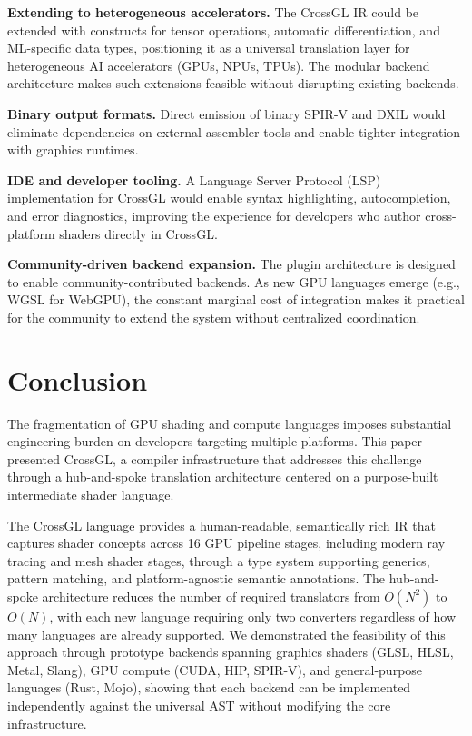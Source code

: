 \documentclass{svproc}
\begin{document}
\textbf{Extending to heterogeneous accelerators.} The CrossGL IR could be extended with constructs for tensor operations, automatic differentiation, and ML-specific data types, positioning it as a universal translation layer for heterogeneous AI accelerators (GPUs, NPUs, TPUs). The modular backend architecture makes such extensions feasible without disrupting existing backends.

\textbf{Binary output formats.} Direct emission of binary SPIR-V and DXIL would eliminate dependencies on external assembler tools and enable tighter integration with graphics runtimes.

\textbf{IDE and developer tooling.} A Language Server Protocol (LSP) implementation for CrossGL would enable syntax highlighting, autocompletion, and error diagnostics, improving the experience for developers who author cross-platform shaders directly in CrossGL.

\textbf{Community-driven backend expansion.} The plugin architecture is designed to enable community-contributed backends. As new GPU languages emerge (e.g., WGSL for WebGPU), the constant marginal cost of integration makes it practical for the community to extend the system without centralized coordination.

\section{Conclusion}

The fragmentation of GPU shading and compute languages imposes substantial engineering burden on developers targeting multiple platforms. This paper presented CrossGL, a compiler infrastructure that addresses this challenge through a hub-and-spoke translation architecture centered on a purpose-built intermediate shader language.

The CrossGL language provides a human-readable, semantically rich IR that captures shader concepts across 16 GPU pipeline stages, including modern ray tracing and mesh shader stages, through a type system supporting generics, pattern matching, and platform-agnostic semantic annotations. The hub-and-spoke architecture reduces the number of required translators from $O(N^2)$ to $O(N)$, with each new language requiring only two converters regardless of how many languages are already supported. We demonstrated the feasibility of this approach through prototype backends spanning graphics shaders (GLSL, HLSL, Metal, Slang), GPU compute (CUDA, HIP, SPIR-V), and general-purpose languages (Rust, Mojo), showing that each backend can be implemented independently against the universal AST without modifying the core infrastructure.
\end{document}
